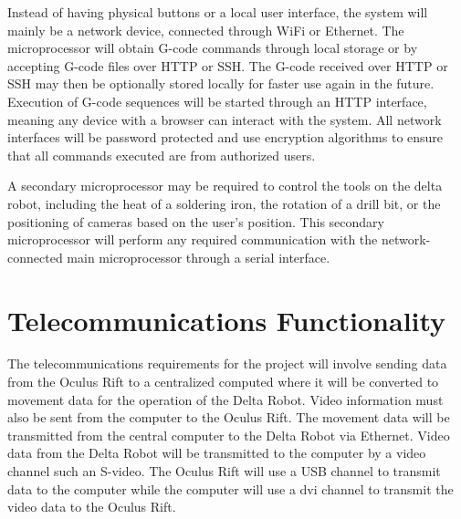 \documentclass[11pt]{report}
\begin{document}
Instead of having physical buttons or a local user interface, the system will mainly be a network device, connected through WiFi or Ethernet.
The microprocessor will obtain G-code commands through local storage or by accepting G-code files over HTTP or SSH.
The G-code received over HTTP or SSH may then be optionally stored locally for faster use again in the future.
Execution of G-code sequences will be started through an HTTP interface, meaning any device with a browser can interact with the system.
All network interfaces will be password protected and use encryption algorithms to ensure that all commands executed are from authorized users. 

A secondary microprocessor may be required to control the tools on the delta robot, including the heat of a soldering iron, the rotation of a drill bit, or the positioning of cameras based on the user's position.
This secondary microprocessor will perform any required communication with the network-connected main microprocessor through a serial interface. 

\section{Telecommunications Functionality}
The telecommunications requirements for the project will involve sending data from the Oculus Rift to a centralized computed where it will be converted to movement data for the operation of the Delta Robot.
Video information must also be sent from the computer to the Oculus Rift.
The movement data will be transmitted from the central computer to the Delta Robot via Ethernet.
Video data from the Delta Robot will be transmitted to the computer by a video channel such an S-video.
The Oculus Rift will use a USB channel to transmit data to the computer while the computer will use a \gls{dvi} channel to transmit the video data to the Oculus Rift.
\end{document}
